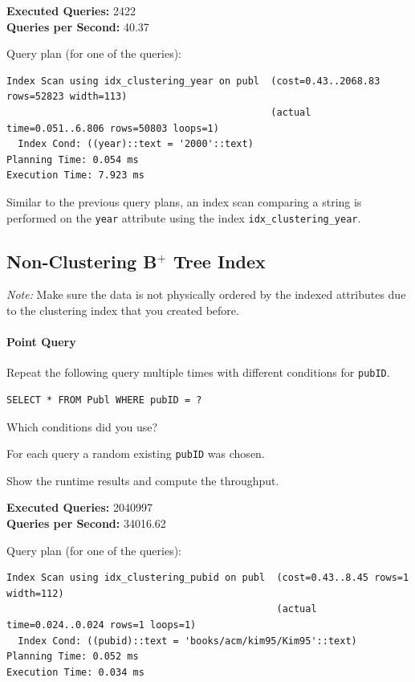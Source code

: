 \documentclass[11pt]{scrartcl}
\begin{document}
\textbf{Executed Queries: } 2422\\
\textbf{Queries per Second: } 40.37

Query plan (for one of the queries):

{\small
\parskip0pt\begin{verbatim}
Index Scan using idx_clustering_year on publ  (cost=0.43..2068.83 rows=52823 width=113)
                                              (actual time=0.051..6.806 rows=50803 loops=1)
  Index Cond: ((year)::text = '2000'::text)
Planning Time: 0.054 ms
Execution Time: 7.923 ms
\end{verbatim}}

Similar to the previous query plans, an index scan comparing a string is performed on the \texttt{year} attribute using the index \texttt{idx\_clustering\_year}.

\subsection*{Non-Clustering B$^+$ Tree Index}

\emph{Note:} Make sure the data is not physically ordered by the indexed attributes due to the clustering index that you created before.

\paragraph{Point Query}

Repeat the following query multiple times with different conditions for \texttt{pubID}.

\begin{lstlisting}[style=dbtsql]
SELECT * FROM Publ WHERE pubID = ?
\end{lstlisting}

Which conditions did you use?

For each query a random existing \texttt{pubID} was chosen.

Show the runtime results and compute the throughput.

\textbf{Executed Queries: } 2040997\\
\textbf{Queries per Second: } 34016.62

Query plan (for one of the queries):

{\small
\parskip0pt\begin{verbatim}
Index Scan using idx_clustering_pubid on publ  (cost=0.43..8.45 rows=1 width=112)
                                               (actual time=0.024..0.024 rows=1 loops=1)
  Index Cond: ((pubid)::text = 'books/acm/kim95/Kim95'::text)
Planning Time: 0.052 ms
Execution Time: 0.034 ms
\end{verbatim}}
\end{document}
